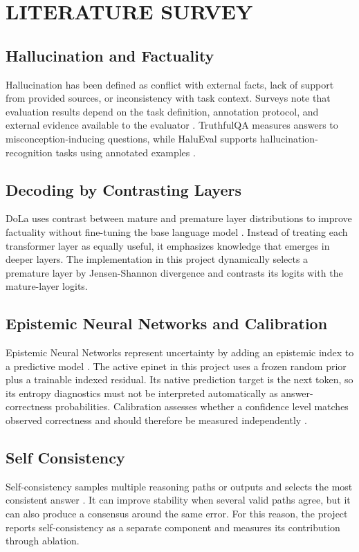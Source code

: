 \documentclass[12pt,a4paper,oneside]{report}
\begin{document}
\chapter{LITERATURE SURVEY}
\section{Hallucination and Factuality}
Hallucination has been defined as conflict with external facts, lack of support from provided sources, or inconsistency with task context. Surveys note that evaluation results depend on the task definition, annotation protocol, and external evidence available to the evaluator \citep{ji2023survey,huang2024audit}. TruthfulQA measures answers to misconception-inducing questions, while HaluEval supports hallucination-recognition tasks using annotated examples \citep{lin2022truthfulqa,li2023halueval}.

\section{Decoding by Contrasting Layers}
DoLa uses contrast between mature and premature layer distributions to improve factuality without fine-tuning the base language model \citep{chuang2024dola}. Instead of treating each transformer layer as equally useful, it emphasizes knowledge that emerges in deeper layers. The implementation in this project dynamically selects a premature layer by Jensen-Shannon divergence and contrasts its logits with the mature-layer logits.

\section{Epistemic Neural Networks and Calibration}
Epistemic Neural Networks represent uncertainty by adding an epistemic index to a predictive model \citep{osband2021enn}. The active epinet in this project uses a frozen random prior plus a trainable indexed residual. Its native prediction target is the next token, so its entropy diagnostics must not be interpreted automatically as answer-correctness probabilities. Calibration assesses whether a confidence level matches observed correctness and should therefore be measured independently \citep{guo2017calibration}.

\section{Self Consistency}
Self-consistency samples multiple reasoning paths or outputs and selects the most consistent answer \citep{wang2023selfconsistency}. It can improve stability when several valid paths agree, but it can also produce a consensus around the same error. For this reason, the project reports self-consistency as a separate component and measures its contribution through ablation.
\end{document}
